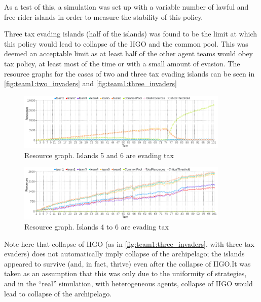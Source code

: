 As a test of this, a simulation was set up with a variable number of lawful and free-rider islands in order to measure the stability of this policy.

Three tax evading islands (half of the islands) was found to be the limit at which this policy would lead to collapse of the IIGO and the common pool. This was deemed an acceptable limit as at least half of the other agent teams would obey tax policy, at least most of the time or with a small amount of evasion. The resource graphs for the cases of two and three tax evading islands can be seen in \autoref{fig:team1:two_invaders} and \autoref{fig:team1:three_invaders}

\begin{figure}[H]
\centering
\includegraphics[width=0.9\textwidth]{09_team1_agentdesign/images/two_invaders}
\caption{Resource graph. Islands 5 and 6 are evading tax}
\label{fig:team1:two_invaders}
\end{figure}

\begin{figure}[H]
\centering
\includegraphics[width=0.9\textwidth]{09_team1_agentdesign/images/three_invaders}
\caption{Resource graph. Islands 4 to 6 are evading tax}
\label{fig:team1:three_invaders}
\end{figure}

Note here that collapse of IIGO (as in \autoref{fig:team1:three_invaders}, with three tax evaders) does not automatically imply collapse of the archipelago; the islands appeared to survive (and, in fact, thrive) even after the collapse of IIGO.\@ It was taken as an assumption that this was only due to the uniformity of strategies, and in the ``real'' simulation, with heterogeneous agents, collapse of IIGO would lead to collapse of the archipelago.



